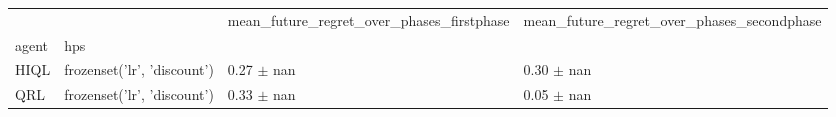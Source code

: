 \begin{tabular}{llll}
\toprule
 &  & mean_future_regret_over_phases_firstphase & mean_future_regret_over_phases_secondphase \\
agent & hps &  &  \\
\midrule
HIQL & frozenset({'lr', 'discount'}) & 0.27 $\pm$ nan & 0.30 $\pm$ nan \\
\cline{1-4}
QRL & frozenset({'lr', 'discount'}) & 0.33 $\pm$ nan & 0.05 $\pm$ nan \\
\cline{1-4}
\bottomrule
\end{tabular}
